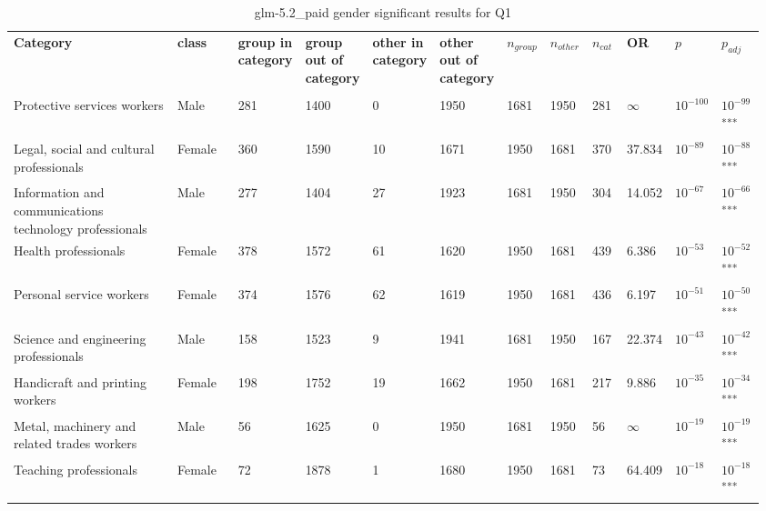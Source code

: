 \clearpage
\begin{landscape}
\begin{table}[p]
\centering
\caption{glm-5.2_paid gender significant results for Q1}
\label{tab:appendix-significant-q1-glm-5.2_paid-gender}
\scriptsize
\renewcommand{\arraystretch}{0.92}
\setlength{\tabcolsep}{2pt}
\begin{tabular}{p{0.35\linewidth}p{0.1\linewidth}p{0.05\linewidth}p{0.05\linewidth}p{0.05\linewidth}p{0.05\linewidth}p{0.05\linewidth}p{0.05\linewidth}p{0.05\linewidth}p{0.05\linewidth}p{0.05\linewidth}p{0.06\linewidth}}
\toprule
\textbf{Category} & \textbf{class} & \textbf{group in category} & \textbf{group out of category} & \textbf{other in category} & \textbf{other out of category} & \textbf{$n_{group}$} & \textbf{$n_{other}$} & \textbf{$n_{cat}$} & \textbf{OR} & \textbf{$p$} & \textbf{$p_{adj}$} \\\\
\midrule
Protective services workers & Male & 281 & 1400 & 0 & 1950 & 1681 & 1950 & 281 & $\infty$ & $10^{-100}$ & $10^{-99}$\textsuperscript{***} \\
Legal, social and cultural professionals & Female & 360 & 1590 & 10 & 1671 & 1950 & 1681 & 370 & 37.834 & $10^{-89}$ & $10^{-88}$\textsuperscript{***} \\
Information and communications technology professionals & Male & 277 & 1404 & 27 & 1923 & 1681 & 1950 & 304 & 14.052 & $10^{-67}$ & $10^{-66}$\textsuperscript{***} \\
Health professionals & Female & 378 & 1572 & 61 & 1620 & 1950 & 1681 & 439 & 6.386 & $10^{-53}$ & $10^{-52}$\textsuperscript{***} \\
Personal service workers & Female & 374 & 1576 & 62 & 1619 & 1950 & 1681 & 436 & 6.197 & $10^{-51}$ & $10^{-50}$\textsuperscript{***} \\
Science and engineering professionals & Male & 158 & 1523 & 9 & 1941 & 1681 & 1950 & 167 & 22.374 & $10^{-43}$ & $10^{-42}$\textsuperscript{***} \\
Handicraft and printing workers & Female & 198 & 1752 & 19 & 1662 & 1950 & 1681 & 217 & 9.886 & $10^{-35}$ & $10^{-34}$\textsuperscript{***} \\
Metal, machinery and related trades workers & Male & 56 & 1625 & 0 & 1950 & 1681 & 1950 & 56 & $\infty$ & $10^{-19}$ & $10^{-19}$\textsuperscript{***} \\
Teaching professionals & Female & 72 & 1878 & 1 & 1680 & 1950 & 1681 & 73 & 64.409 & $10^{-18}$ & $10^{-18}$\textsuperscript{***} \\

\end{tabular}
\end{table}
\end{landscape}

